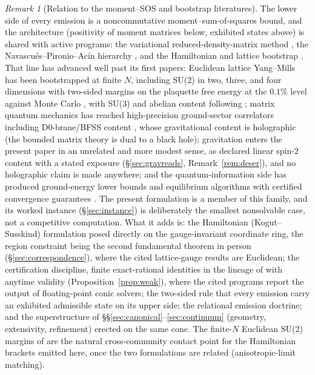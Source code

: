 \documentclass[11pt]{article}
\theoremstyle{definition}
\theoremstyle{remark}
\newtheorem{remark}[theorem]{Remark}
\begin{document}
\begin{remark}[Relation to the moment--SOS and bootstrap literatures]
\label{rem:bootstrap}
The lower side of every emission is a noncommutative
moment--sum-of-squares bound, and the architecture (positivity of
moment matrices below, exhibited states above) is shared with active
programs: the variational reduced-density-matrix method
\cite{coleman,mazziotti}, the Navascu\'es--Pironio--Ac\'in hierarchy
\cite{npa}, and the Hamiltonian and lattice bootstrap
\cite{lin,hhk,andersonkruczenski,kazakovzheng}.  That line has advanced
well past its first papers: Euclidean lattice Yang--Mills has been
bootstrapped at finite $N$, including SU(2) in two, three, and four
dimensions with two-sided margins on the plaquette free energy at the
$0.1\%$ level against Monte Carlo \cite{kazakovzhengfinite}, with
SU(3) and abelian content following \cite{guosu3,lizhou}; matrix
quantum mechanics has reached high-precision ground-sector correlators
including D0-brane/BFSS content \cite{lindzero,linzhengmatrix}, whose
gravitational content is holographic (the bounded matrix theory is
dual to a black hole); gravitation enters the present paper in an
unrelated and more modest sense, as declared linear spin-2 content
with a stated exposure (\S\ref{sec:gravreads},
Remark~\ref{rem:deser}), and no holographic claim is made anywhere;
and
the quantum-information side has produced ground-energy lower bounds
and equilibrium algorithms with certified convergence guarantees
\cite{kull,fawzi}.  The present formulation is a member of this
family, and its worked instance (\S\ref{sec:instance}) is deliberately
the smallest nonsolvable case, not a competitive computation.  What it
adds is: the Hamiltonian (Kogut--Susskind) formulation posed directly
on the gauge-invariant coordinate ring, the region constraint being
the second fundamental theorem in person
(\S\ref{sec:correspondence}), where the cited lattice-gauge results
are Euclidean; the certification discipline, finite exact-rational
identities in the lineage of \cite{peyrlparrilo} with anytime validity
(Proposition~\ref{prop:weak}), where the cited programs report the
output of floating-point conic solvers; the two-sided rule that every
emission carry an exhibited admissible state on its upper side; the
relational emission doctrine; and the superstructure of
\S\S\ref{sec:canonical}--\ref{sec:continuum} (geometry, extensivity,
refinement) erected on the same cone.  The finite-$N$ Euclidean SU(2)
margins of \cite{kazakovzhengfinite} are the natural cross-community
contact point for the Hamiltonian brackets emitted here, once the two
formulations are related (anisotropic-limit matching).
\end{remark}
\end{document}
